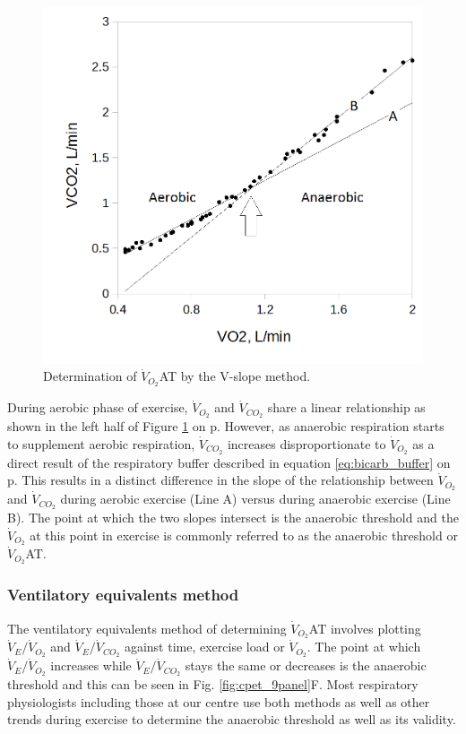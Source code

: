 \begin{figure}[htbp]
	\centering
	\includegraphics[width=\textwidth]{Figures/cpet_vslope}
	\caption{Determination of $\dot{V}_{O_2}$AT by the V-slope method.}
	\label{fig:cpet_vslope}
\end{figure}

During aerobic phase of exercise, $\dot{V}_{O_2}$ and $\dot{V}_{CO_2}$ share a linear relationship as shown in the left half of Figure \ref{fig:cpet_vslope} on p\pageref{fig:cpet_vslope}. 
However, as anaerobic respiration starts to supplement aerobic respiration, $\dot{V}_{CO_2}$ increases disproportionate to $\dot{V}_{O_2}$ as a direct result of the respiratory buffer described in equation \ref{eq:bicarb_buffer} on p\pageref{eq:bicarb_buffer}. 
This results in a distinct difference in the slope of the relationship between $\dot{V}_{O_2}$ and $\dot{V}_{CO_2}$ during aerobic exercise (Line A) versus during anaerobic exercise (Line B). 
The point at which the two slopes intersect is the anaerobic threshold and the $\dot{V}_{O_2}$ at this point in exercise is commonly referred to as the anaerobic threshold or $\dot{V}_{O_2}$AT.

\subsubsection{Ventilatory equivalents method}
The ventilatory equivalents method of determining $\dot{V}_{O_2}$AT involves plotting $\dot{V}_E/\dot{V}_{O_2}$
and $\dot{V}_E/\dot{V}_{CO_2}$ against time, exercise load or $\dot{V}_{O_2}$. 
The point at which $\dot{V}_E/\dot{V}_{O_2}$ increases while $\dot{V}_E/\dot{V}_{CO_2}$ stays the same or decreases is the anaerobic threshold and this can be seen in Fig. \ref{fig:cpet_9panel}F. 
Most respiratory physiologists including those at our centre use both methods as well as other trends during exercise to determine the anaerobic threshold as well as its validity.


